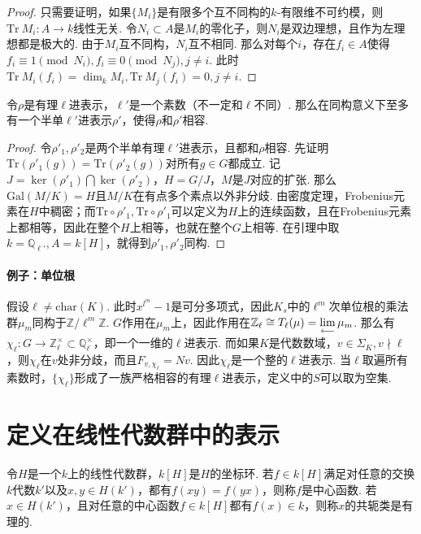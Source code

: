 \begin{proof}
    只需要证明，如果$\{M_i\}$是有限多个互不同构的$k$-有限维不可约模，则$\mathrm{Tr}\ M_i: A\to k$线性无关. 令$N_i\subset A$是$M_i$的零化子，则$N_i$是双边理想，且作为左理想都是极大的. 由于$M_i$互不同构，$N_i$互不相同. 那么对每个$i$，存在$f_i\in A$使得$f_i\equiv 1\pmod{N_i}, f_i\equiv 0\pmod{N_j}, j\neq i$. 此时$\mathrm{Tr}\ M_i(f_i) = \dim_k M_i, \mathrm{Tr}\ M_j(f_i) = 0, j\neq i$.
\end{proof}

\begin{cthm}
    令$\rho$是有理$\ell$进表示，$\ell'$是一个素数（不一定和$\ell$不同）. 那么在同构意义下至多有一个半单$\ell'$进表示$\rho'$，使得$\rho$和$\rho'$相容.
\end{cthm}

\begin{proof}
    令$\rho'_1, \rho'_2$是两个半单有理$\ell'$进表示，且都和$\rho$相容. 先证明$\mathrm{Tr}(\rho'_1(g)) = \mathrm{Tr}(\rho'_2(g))$对所有$g\in G$都成立. 记$J = \ker(\rho'_1)\bigcap \ker(\rho'_2)$，$H = G/J$，$M$是$J$对应的扩张. 那么$\mathrm{Gal}(M/K) = H$且$M/K$在有点多个素点以外非分歧. 由\Chebotarev 密度定理，Frobenius元素在$H$中稠密；而$\mathrm{Tr}\circ \rho'_1, \mathrm{Tr}\circ \rho'_1$可以定义为$H$上的连续函数，且在Frobenius元素上都相等，因此在整个$H$上相等，也就在整个$G$上相等. 在引理中取$k = \mathbb{Q}_{\ell'}, A = k[H]$，就得到$\rho'_1, \rho'_2$同构.
\end{proof}

\paragraph{例子：单位根}
假设$\ell\neq \mathrm{char}(K)$. 此时$x^{l^m}-1$是可分多项式，因此$K_s$中的$\ell^m$次单位根的乘法群$\mu_m$同构于$\mathbb{Z}/\ell^m \mathbb{Z}$. $G$作用在$\mu_m$上，因此作用在$\mathbb{Z}_{\ell} \cong T_{\ell}(\mu) = \lim\limits_{\longleftarrow}\mu_m$. 那么有$\chi_{\ell}:G\to \mathbb{Z}_{\ell}^{\times}\subset \mathbb{Q}_{\ell}^{\times}$，即一个一维的$\ell$进表示. 而如果$K$是代数数域，$v\in \Sigma_K, v\nmid \ell$，则$\chi_{\ell}$在$v$处非分歧，而且$F_{v, \chi_{\ell}} = Nv$. 因此$\chi_{\ell}$是一个整的$\ell$进表示. 当$\ell$取遍所有素数时，$\{\chi_{\ell}\}$形成了一族严格相容的有理$\ell$进表示，定义中的$S$可以取为空集.

\section{定义在线性代数群中的表示}

\begin{cdef}
    令$H$是一个$k$上的线性代数群，$k[H]$是$H$的坐标环. 若$f\in k[H]$满足对任意的交换$k$代数$k'$以及$x,y\in H(k')$，都有$f(xy)=f(yx)$，则称$f$是中心函数. 若$x\in H(k')$，且对任意的中心函数$f\in k[H]$都有$f(x)\in k$，则称$x$的共轭类是有理的.
\end{cdef}


